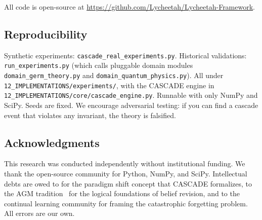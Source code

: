 \documentclass[11pt,a4paper]{article}
\theoremstyle{definition}
\begin{document}
All code is open-source at \url{https://github.com/Lycheetah/Lycheetah-Framework}.

\subsection*{Reproducibility}

Synthetic experiments: \texttt{cascade\_real\_experiments.py}.
Historical validations: \texttt{run\_experiments.py} (which calls pluggable domain
modules \texttt{domain\_germ\_theory.py} and \texttt{domain\_quantum\_physics.py}).
All under \texttt{12\_IMPLEMENTATIONS/experiments/}, with the CASCADE engine in
\texttt{12\_IMPLEMENTATIONS/core/cascade\_engine.py}.
Runnable with only NumPy and SciPy.
Seeds are fixed. We encourage adversarial testing: if you can find a cascade event that
violates any invariant, the theory is falsified.

\subsection*{Acknowledgments}

This research was conducted independently without institutional funding. We thank the
open-source community for Python, NumPy, and SciPy. Intellectual debts are owed to
\citet{kuhn1962structure} for the paradigm shift concept that CASCADE formalizes,
to the AGM tradition~\citep{alchourron1985logic,gardenfors1988knowledge} for the
logical foundations of belief revision, and to the continual learning community for
framing the catastrophic forgetting problem. All errors are our own.
\end{document}
